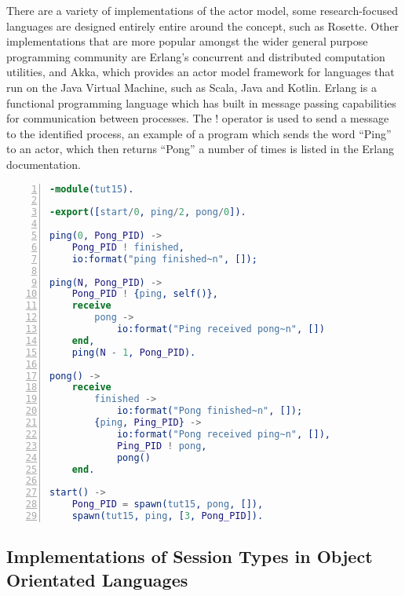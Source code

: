 \documentclass{article}
\begin{document}
	There are a variety of implementations of the actor model, some research-focused languages are designed entirely entire around the concept, such as Rosette\cite{Tomlinson:1988:ROC:67387.67410}. Other implementations that are more popular amongst the wider general purpose programming community are Erlang’s concurrent and distributed computation utilities, and Akka, which provides an actor model framework for languages that run on the Java Virtual Machine, such as Scala, Java and Kotlin. 
	Erlang is a functional programming language which has built in message passing capabilities for communication between processes. The ! operator is used to send a message to the identified process, an example of a program which sends the word “Ping” to an actor, which then returns “Pong” a number of times is listed in the Erlang documentation\cite{ErlangConcDocs}.
	\begin{lstlisting}[language=Erlang, frame=single, numbers=left, caption=Ping Pong in concurrent Erlang\cite{ErlangConcDocs}]
-module(tut15).

-export([start/0, ping/2, pong/0]).

ping(0, Pong_PID) ->
	Pong_PID ! finished,
	io:format("ping finished~n", []);

ping(N, Pong_PID) ->
	Pong_PID ! {ping, self()},
	receive
		pong ->
			io:format("Ping received pong~n", [])
	end,
	ping(N - 1, Pong_PID).

pong() ->
	receive
		finished ->
			io:format("Pong finished~n", []);
		{ping, Ping_PID} ->
			io:format("Pong received ping~n", []),
			Ping_PID ! pong,
			pong()
	end.

start() ->
	Pong_PID = spawn(tut15, pong, []),
	spawn(tut15, ping, [3, Pong_PID]).
	\end{lstlisting}

	\subsection{Implementations of Session Types in Object Orientated Languages}
	\pagebreak
	\printbibliography
\end{document}
